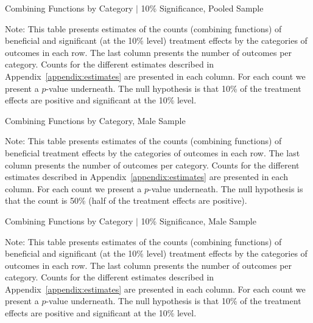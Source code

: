 	\begin{table}[H]
     \caption{Combining Functions by Category $|$ 10\% Significance, Pooled Sample} 
     \label{table:abccare_rslt_pooled_counts_n10a10}
	
	\end{table}
\begin{spacing}{1}
\begin{footnotesize}
\noindent Note: This table presents estimates of the counts (combining functions) of beneficial and significant (at the 10\% level) treatment effects by the categories of outcomes in each row. The last column presents the number of outcomes per category. Counts for the different estimates described in Appendix~\ref{appendix:estimates} are presented in each column. For each count we present a $p$-value underneath. The null hypothesis is that 10\% of the treatment effects are positive and significant at the 10\% level.
\end{footnotesize}
\end{spacing}

	\begin{table}[H]
     \caption{Combining Functions by Category, Male Sample} 
     \label{table:abccare_rslt_male_counts_n50a100}
	
	\end{table}
\begin{spacing}{1}
\begin{footnotesize}
\noindent Note: This table presents estimates of the counts (combining functions) of beneficial treatment effects by the categories of outcomes in each row. The last column presents the number of outcomes per category. Counts for the different estimates described in Appendix~\ref{appendix:estimates} are presented in each column. For each count we present a $p$-value underneath. The null hypothesis is that the count is 50\% (half of the treatment effects are positive).
\end{footnotesize}
\end{spacing}   

	\begin{table}[H]
     \caption{Combining Functions by Category $|$ 10\% Significance, Male Sample} 
     \label{table:abccare_rslt_male_counts_n10a10}
	
	\end{table}
\begin{spacing}{1}
\begin{footnotesize}
\noindent Note: This table presents estimates of the counts (combining functions) of beneficial and significant (at the 10\% level) treatment effects by the categories of outcomes in each row. The last column presents the number of outcomes per category. Counts for the different estimates described in Appendix~\ref{appendix:estimates} are presented in each column. For each count we present a $p$-value underneath. The null hypothesis is that 10\% of the treatment effects are positive and significant at the 10\% level.
\end{footnotesize}
\end{spacing}
  

